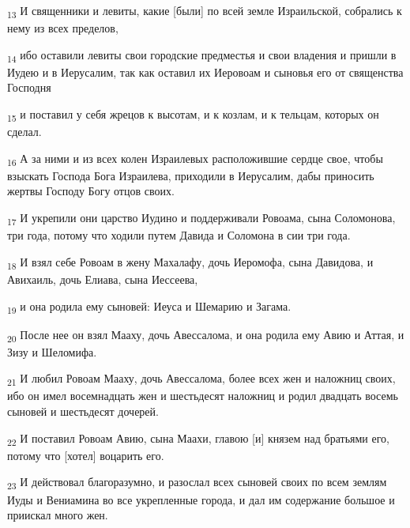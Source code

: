 \begin{tcolorbox}
\textsubscript{13} И священники и левиты, какие [были] по всей земле Израильской, собрались к нему из всех пределов,
\end{tcolorbox}
\begin{tcolorbox}
\textsubscript{14} ибо оставили левиты свои городские предместья и свои владения и пришли в Иудею и в Иерусалим, так как оставил их Иеровоам и сыновья его от священства Господня
\end{tcolorbox}
\begin{tcolorbox}
\textsubscript{15} и поставил у себя жрецов к высотам, и к козлам, и к тельцам, которых он сделал.
\end{tcolorbox}
\begin{tcolorbox}
\textsubscript{16} А за ними и из всех колен Израилевых расположившие сердце свое, чтобы взыскать Господа Бога Израилева, приходили в Иерусалим, дабы приносить жертвы Господу Богу отцов своих.
\end{tcolorbox}
\begin{tcolorbox}
\textsubscript{17} И укрепили они царство Иудино и поддерживали Ровоама, сына Соломонова, три года, потому что ходили путем Давида и Соломона в сии три года.
\end{tcolorbox}
\begin{tcolorbox}
\textsubscript{18} И взял себе Ровоам в жену Махалафу, дочь Иеромофа, сына Давидова, и Авихаиль, дочь Елиава, сына Иессеева,
\end{tcolorbox}
\begin{tcolorbox}
\textsubscript{19} и она родила ему сыновей: Иеуса и Шемарию и Загама.
\end{tcolorbox}
\begin{tcolorbox}
\textsubscript{20} После нее он взял Мааху, дочь Авессалома, и она родила ему Авию и Аттая, и Зизу и Шеломифа.
\end{tcolorbox}
\begin{tcolorbox}
\textsubscript{21} И любил Ровоам Мааху, дочь Авессалома, более всех жен и наложниц своих, ибо он имел восемнадцать жен и шестьдесят наложниц и родил двадцать восемь сыновей и шестьдесят дочерей.
\end{tcolorbox}
\begin{tcolorbox}
\textsubscript{22} И поставил Ровоам Авию, сына Маахи, главою [и] князем над братьями его, потому что [хотел] воцарить его.
\end{tcolorbox}
\begin{tcolorbox}
\textsubscript{23} И действовал благоразумно, и разослал всех сыновей своих по всем землям Иуды и Вениамина во все укрепленные города, и дал им содержание большое и приискал много жен.
\end{tcolorbox}
